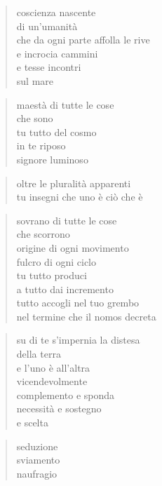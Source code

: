 	\begin{verse}
		coscienza nascente\\
		di un’umanità\\
		che da ogni parte affolla le rive\\
		e incrocia cammini\\
		e tesse incontri\\
		sul mare
	\end{verse}


\clearpage



	\begin{verse}
		maestà di tutte le cose\\
		che sono\\
		tu tutto del cosmo\\
		in te riposo\\
		signore luminoso
	\end{verse}

	\begin{verse}
		oltre le pluralità apparenti\\
		tu insegni che uno è ciò che è
	\end{verse}

	\begin{verse}
		sovrano di tutte le cose\\
		che scorrono\\
		origine di ogni movimento\\
		fulcro di ogni ciclo\\
		tu tutto produci\\
		a tutto dai incremento\\
		tutto accogli nel tuo grembo\\
		nel termine che il nomos decreta
	\end{verse}

	\begin{verse}
		su di te s’impernia la distesa\\
		della terra\\
		e l’uno è all’altra\\
		vicendevolmente\\
		complemento e sponda\\
		necessità e sostegno\\
		e scelta
	\end{verse}


\clearpage



	\begin{verse}
		seduzione\\
		sviamento\\
		naufragio
	\end{verse}


